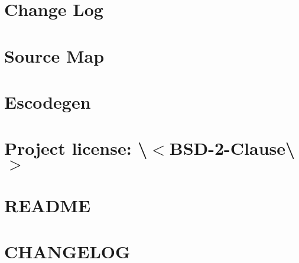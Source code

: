 \documentclass[twoside]{book}
\newcommand{\+}{\discretionary{\mbox{\scriptsize$\hookleftarrow$}}{}{}}
\begin{document}
\chapter{Change Log}
\label{md__c_1_workspace_demo_src_main_script_node_modules_escodegen_node_modules_source-map__c_h_a_n_g_e_l_o_g}

\chapter{Source Map}
\label{md__c_1_workspace_demo_src_main_script_node_modules_escodegen_node_modules_source-map__r_e_a_d_m_e}

\chapter{Escodegen}
\label{md__c_1_workspace_demo_src_main_script_node_modules_escodegen__r_e_a_d_m_e}

\chapter{Project license\+: \textbackslash{}$<$B\+S\+D-\/2-\/\+Clause\textbackslash{}$>$}
\label{md__c_1_workspace_demo_src_main_script_node_modules_escope__c_o_n_t_r_i_b_u_t_i_n_g}

\chapter{R\+E\+A\+D\+ME}
\label{md__c_1_workspace_demo_src_main_script_node_modules_escope__r_e_a_d_m_e}

\chapter{C\+H\+A\+N\+G\+E\+L\+OG}
\label{md__c_1_workspace_demo_src_main_script_node_modules_eslint__c_h_a_n_g_e_l_o_g}

\end{document}
